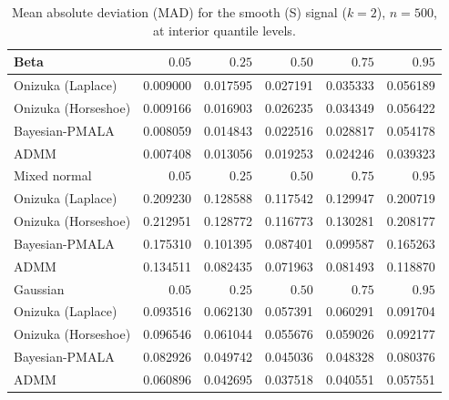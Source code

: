 \begin{table}[!htbp]
\centering
\small
\caption{Mean absolute deviation (MAD) for the smooth (S) signal ($k=2$), $n=500$, at interior quantile levels.}
\label{tab:s_int_mad}
\begin{tabular}{lrrrrr}
\toprule
Beta & $0.05$ & $0.25$ & $0.50$ & $0.75$ & $0.95$ \\
\midrule
Onizuka (Laplace) & 0.009000 & 0.017595 & 0.027191 & 0.035333 & 0.056189 \\
Onizuka (Horseshoe) & 0.009166 & 0.016903 & 0.026235 & 0.034349 & 0.056422 \\
Bayesian-PMALA & 0.008059 & 0.014843 & 0.022516 & 0.028817 & 0.054178 \\
ADMM & 0.007408 & 0.013056 & 0.019253 & 0.024246 & 0.039323 \\
\midrule
Mixed normal & $0.05$ & $0.25$ & $0.50$ & $0.75$ & $0.95$ \\
\midrule
Onizuka (Laplace) & 0.209230 & 0.128588 & 0.117542 & 0.129947 & 0.200719 \\
Onizuka (Horseshoe) & 0.212951 & 0.128772 & 0.116773 & 0.130281 & 0.208177 \\
Bayesian-PMALA & 0.175310 & 0.101395 & 0.087401 & 0.099587 & 0.165263 \\
ADMM & 0.134511 & 0.082435 & 0.071963 & 0.081493 & 0.118870 \\
\midrule
Gaussian & $0.05$ & $0.25$ & $0.50$ & $0.75$ & $0.95$ \\
\midrule
Onizuka (Laplace) & 0.093516 & 0.062130 & 0.057391 & 0.060291 & 0.091704 \\
Onizuka (Horseshoe) & 0.096546 & 0.061044 & 0.055676 & 0.059026 & 0.092177 \\
Bayesian-PMALA & 0.082926 & 0.049742 & 0.045036 & 0.048328 & 0.080376 \\
ADMM & 0.060896 & 0.042695 & 0.037518 & 0.040551 & 0.057551 \\
\bottomrule
\end{tabular}
\end{table}
